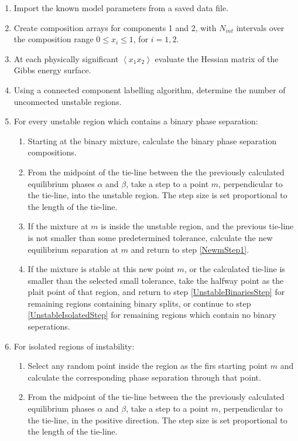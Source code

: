 \begin{enumerate}
\item Import the known model parameters from a saved data file.\
\item Create composition arrays for components 1 and 2, with $N_{int}$ intervals over the composition range $0\leq x_{i}\leq1$, for $i =1, 2$. \
\item At each physically significant $\left\langle x_{1} x_{2}\right\rangle$ evaluate the Hessian matrix of the Gibbs energy surface.\
\item Using a connected component labelling algorithm, determine the number of unconnected unstable regions.\
\item For every unstable region which contains a binary phase separation:\label{UnstableBinariesStep}\
\begin{enumerate}
	\item Starting at the binary mixture, calculate the binary phase separation compositions.\
	\item From the midpoint of the tie-line between the the previously calculated equilibrium phases $\alpha$ and $\beta$, take a step to a point $m$, perpendicular to the tie-line, into the unstable region. The step size is set proportional to the length of the tie-line.\label{NewmStep1}\
	\item If the mixture at $m$ is inside the unstable region, and the previous tie-line is not smaller than some predetermined tolerance, calculate the new equilibrium separation at $m$ and return to step \ref{NewmStep1}.\
	\item If the mixture is stable at this new point $m$, or the calculated tie-line is smaller than the selected small tolerance, take the halfway point as the plait point of that region, and return to step \ref{UnstableBinariesStep} for remaining regions containing binary splits, or continue to step \ref{UnstableIsolatedStep} for remaining regions which contain no binary seperations.\
\end{enumerate}
\item For isolated regions of instability:\label{UnstableIsolatedStep}\
\begin{enumerate}
	\item Select any random point inside the region as the firs starting point $m$ and calculate the corresponding phase separation through that point.\
	\item From the midpoint of the tie-line between the the previously calculated equilibrium phases $\alpha$ and $\beta$, take a step to a point $m$, perpendicular to the tie-line, in the positive direction. The step size is set proportional to the length of the tie-line.\label{NewmStep2}\

\end{enumerate}
\end{enumerate}
